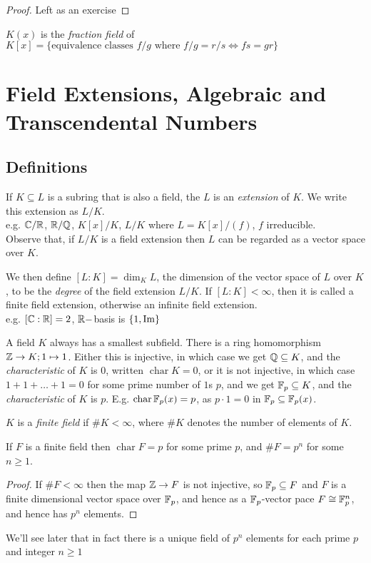 \documentclass[a4paper, 10pt, twocolumn]{amsart}
\renewcommand{\charr}{\operatorname{char}}
\begin{document}
\begin{proof}
Left as an exercise
\end{proof}

$K(x)$ is the \emph{fraction field} of $K[x] = \{\text{equivalence classes } f/g \text{ where } f/g=r/s \iff fs=gr\}$

\section{Field Extensions, Algebraic and Transcendental Numbers}
\subsection{Definitions}
If $K \subseteq L$ is a subring that is also a field, the $L$ is an \emph{extension} of $K$. We write this extension as $L/K$.\\
e.g. $\mathbb{C}/\mathbb{R}$, $\mathbb{R}/\mathbb{Q}$, $K[x]/K$, $L/K$ where $L = K[x]/(f)$, $f$ irreducible.\\
Observe that, if $L/K$ is a field extension then $L$ can be regarded as a vector space over $K$.

We then define $[L:K] = \dim_K L$, the dimension of the vector space of $L$ over $K$, to be the \emph{degree} of the field extension $L/K$. If $[L:K] < \infty$, then it is called a finite field extension, otherwise an infinite field extension.\\
e.g. $[\mathbb{C}:\mathbb{R}] = 2$, $\mathbb{R}-$basis is $\{1, \operatorname{Im}\}$

A field $K$ always has a smallest subfield. There is a ring homomorphism $\mathbb{Z} \rightarrow K; 1 \mapsto 1$. Either this is injective, in which case we get $\mathbb{Q} \subseteq K$, and the \emph{characteristic} of $K$ is $0$, written $\charr K = 0$, or it is not injective, in which case $1+1+\ldots+1 = 0$ for some prime number of $1$s $p$, and we get $\mathbb{F}_p \subseteq K$, and the \emph{characteristic} of $K$ is $p$. E.g. $\charr \F_p(x) = p$, as $p\cdot 1 = 0$ in $\mathbb{F}_p \subseteq \mathbb{F}_p(x)$.

$K$ is a \emph{finite field} if $\#K < \infty$, where $\#K$ denotes the number of elements of $K$.

\begin{lemma}
If $F$ is a finite field then $\charr F = p$ for some prime $p$, and $\#F = p^n$ for some $n \geq 1$.
\end{lemma}
\begin{proof}
If $\#F < \infty$ then the map $\mathbb{Z} \rightarrow F$ is not injective, so $\mathbb{F}_p \subseteq F$ and $F$ is a finite dimensional vector space over $\mathbb{F}_p$, and hence as a $\mathbb{F}_p$-vector pace $F\cong \mathbb{F}_p^n$, and hence has $p^n$ elements.
\end{proof}
We'll see later that in fact there is a unique field of $p^n$ elements for each prime $p$ and integer $n\geq 1$
\end{document}
